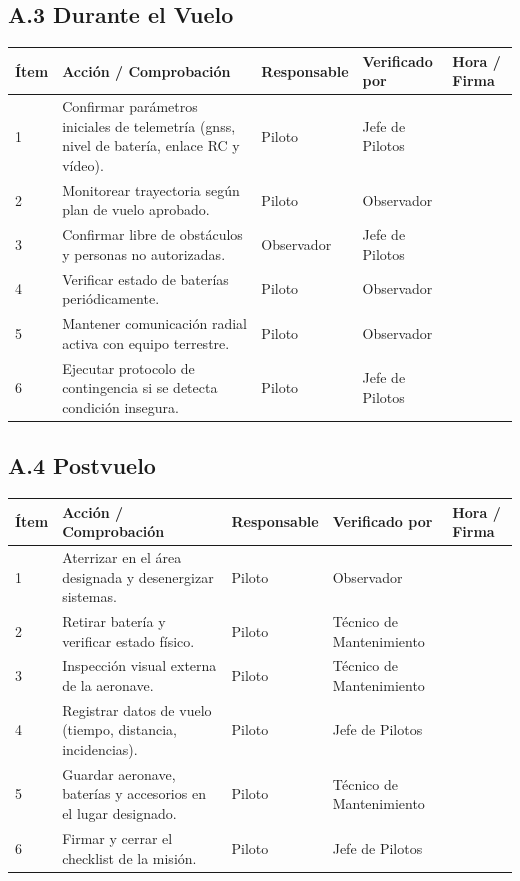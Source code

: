 \subsection*{A.3 Durante el Vuelo}

\begin{table}[H]
    \centering
    \begin{tabular}{|p{0.8cm}|p{7cm}|p{2.5cm}|p{2.5cm}|p{2.5cm}|}
        \hline
        \textbf{Ítem} & \textbf{Acción / Comprobación} & \textbf{Responsable} & \textbf{Verificado por} & \textbf{Hora / Firma} \\ \hline
        1 & Confirmar parámetros iniciales de telemetría (\gls{gnss}, nivel de batería, enlace RC y vídeo). & Piloto & Jefe de Pilotos &  \\ \hline
        2 & Monitorear trayectoria según plan de vuelo aprobado. & Piloto & Observador &  \\ \hline
        3 & Confirmar libre de obstáculos y personas no autorizadas. & Observador & Jefe de Pilotos &  \\ \hline
        4 & Verificar estado de baterías periódicamente. & Piloto & Observador &  \\ \hline
        5 & Mantener comunicación radial activa con equipo terrestre. & Piloto & Observador &  \\ \hline
        6 & Ejecutar protocolo de contingencia si se detecta condición insegura. & Piloto & Jefe de Pilotos &  \\ \hline
    \end{tabular}
\end{table}

\subsection*{A.4 Postvuelo}

\begin{table}[H]
    \centering
    \begin{tabular}{|p{0.8cm}|p{7cm}|p{2.5cm}|p{2.5cm}|p{2.5cm}|}
        \hline
        \textbf{Ítem} & \textbf{Acción / Comprobación} & \textbf{Responsable} & \textbf{Verificado por} & \textbf{Hora / Firma} \\ \hline
        1 & Aterrizar en el área designada y desenergizar sistemas. & Piloto & Observador &  \\ \hline
        2 & Retirar batería y verificar estado físico. & Piloto & Técnico de Mantenimiento &  \\ \hline
        3 & Inspección visual externa de la aeronave. & Piloto & Técnico de Mantenimiento &  \\ \hline
        4 & Registrar datos de vuelo (tiempo, distancia, incidencias). & Piloto & Jefe de Pilotos &  \\ \hline
        5 & Guardar aeronave, baterías y accesorios en el lugar designado. & Piloto & Técnico de Mantenimiento &  \\ \hline
        6 & Firmar y cerrar el checklist de la misión. & Piloto & Jefe de Pilotos &  \\ \hline
    \end{tabular}
\end{table}
